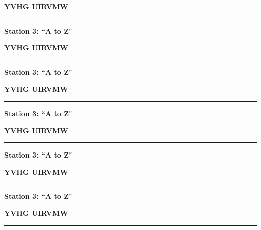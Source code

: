 \documentclass{article}
\begin{document}
\textbf{YVHG UIRVMW}
\vspace{3mm}

\hrule
\vspace{3mm}

\textbf{Station 3: ``A to Z"}
\vspace{4mm}

\textbf{YVHG UIRVMW}
\vspace{3mm}

\hrule
\vspace{3mm}

\textbf{Station 3: ``A to Z"}
\vspace{4mm}

\textbf{YVHG UIRVMW}
\vspace{3mm}

\hrule
\vspace{3mm}

\textbf{Station 3: ``A to Z"}
\vspace{4mm}

\textbf{YVHG UIRVMW}
\vspace{3mm}

\hrule
\vspace{3mm}

\textbf{Station 3: ``A to Z"}
\vspace{4mm}

\textbf{YVHG UIRVMW}
\vspace{3mm}

\hrule
\vspace{3mm}

\textbf{Station 3: ``A to Z"}
\vspace{4mm}

\textbf{YVHG UIRVMW}
\vspace{3mm}

\hrule
\end{document}

